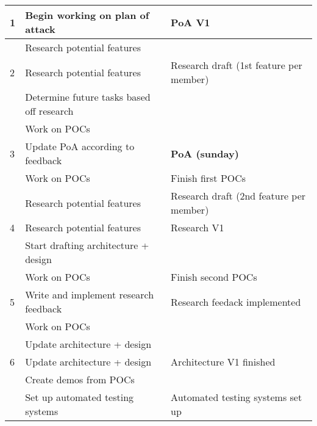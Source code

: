 \documentclass{article} %
\begin{document}
\begin{longtable}{|l|p{}|p{}|}
    1                    & Begin working on plan of attack           & PoA V1                                  \\ \hline
                         & Research potential features               &                                         \\ \hline
    2                    & Research potential features               & Research draft (1st feature per member) \\ \hline
                         & Determine future tasks based off research &                                         \\ \hline
                         & Work on POCs                              &                                         \\ \hline
    3                    & Update PoA according to feedback          & \textbf{PoA (sunday)}                   \\ \hline
                         & Work on POCs                              & Finish first POCs                       \\ \hline
                         & Research potential features               & Research draft (2nd feature per member) \\ \hline
    4                    & Research potential features               & Research V1                             \\ \hline
                         & Start drafting architecture + design      &                                         \\ \hline
                         & Work on POCs                              & Finish second POCs                      \\ \hline
    5                    & Write and implement research feedback     & Research feedack implemented            \\ \hline
                         & Work on POCs                              &                                         \\ \hline
                         & Update architecture + design              &                                         \\ \hline
    6                    & Update architecture + design              & Architecture V1 finished                \\ \hline
                         & Create demos from POCs                    &                                         \\ \hline
                         & Set up automated testing systems          & Automated testing systems set up        \\ \hline

\end{longtable}
\end{document}

